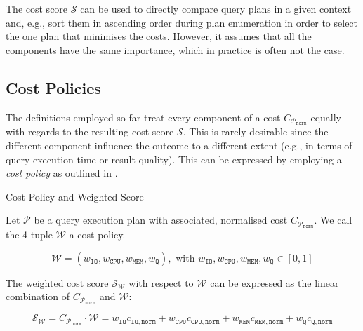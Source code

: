 The cost score $\mathcal{S}$ can be used to directly compare query plans in a given context and, e.g., sort them in ascending order during plan enumeration in order to select the one plan that minimises the costs. However, it assumes that all the components have the same importance, which in practice is often not the case.

\subsection{Cost Policies}

The definitions employed so far treat every component of a cost $C_{\mathcal{P}_{\mathtt{norm}}}$ equally with regards to the resulting cost score $\mathcal{S}$. This is rarely desirable since the different component influence the outcome to a different extent (e.g., in terms of query execution time or result quality). This can be expressed by employing a \emph{cost policy} as outlined in .

\begin{definition}[label=definition:cost_policy]{Cost Policy and Weighted Score}{}

    Let $\mathcal{P}$  be a query execution plan with associated, normalised cost $C_{\mathcal{P}_{\mathtt{norm}}}$. We call the 4-tuple $\mathcal{W}$ a cost-policy.

    \begin{equation*}
        \mathcal{W} = (w_{\mathtt{IO}}, w_{\mathtt{CPU}}, w_{\mathtt{MEM}}, w_{\mathtt{Q}}), \text{ with } w_{\mathtt{IO}},  w_{\mathtt{CPU}}, w_{\mathtt{MEM}}, w_{\mathtt{Q}} \in [0, 1]
    \end{equation*}

   The weighted cost score $\mathcal{S}_{\mathcal{W}}$ with respect to $\mathcal{W}$ can be expressed as the linear combination of $C_{\mathcal{P}_{\mathtt{norm}}}$ and $\mathcal{W}$:

    \begin{equation*}
        \mathcal{S}_{\mathcal{W}} = C_{\mathcal{P}_{\mathtt{norm}}} \cdot \mathcal{W} = w_{\mathtt{IO}}c_{\mathtt{IO},\mathtt{norm}} + w_{\mathtt{CPU}} c_{\mathtt{CPU},\mathtt{norm}} + w_{\mathtt{MEM}} c_{\mathtt{MEM},\mathtt{norm}} + w_{\mathtt{Q}} c_{\mathtt{Q},\mathtt{norm}}
    \end{equation*}
\end{definition}

